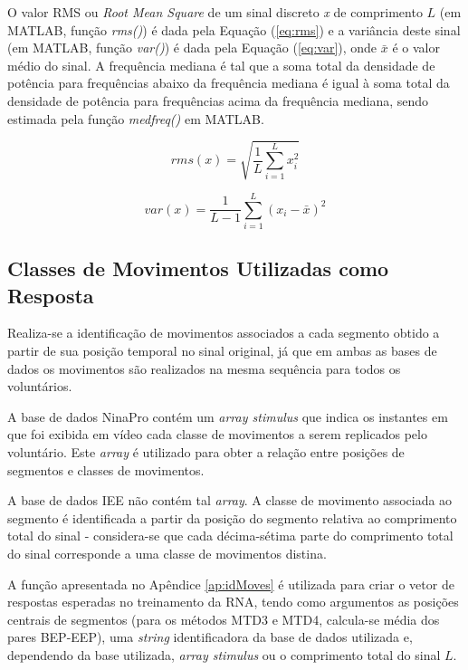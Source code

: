 O valor RMS ou \emph{Root Mean Square} de um sinal discreto \emph{x} de comprimento $L$ (em MATLAB, função \emph{rms()}) é dada pela Equação (\ref{eq:rms}) e a variância deste sinal (em MATLAB, função \emph{var()}) é dada pela Equação (\ref{eq:var}), onde $\bar{x}$ é o valor médio do sinal. A frequência mediana é tal que a soma total da densidade de potência para frequências abaixo da frequência mediana é igual à soma total da densidade de potência para frequências acima da frequência mediana, sendo estimada pela função \emph{medfreq()} em MATLAB.

\begin{equation}
	\label{eq:rms}
	rms(x) = \sqrt{\frac{1}{L}\sum\limits_{i=1}^{L}x_i^2} 
\end{equation}

\begin{equation}
	\label{eq:var}
	var(x) = \frac{1}{L-1}\sum\limits_{i=1}^{L}(x_i - \bar{x})^2
\end{equation}

			\subsection{Classes de Movimentos Utilizadas como Resposta}
Realiza-se a identificação de movimentos associados a cada segmento obtido a partir de sua posição temporal no sinal original, já que em ambas as bases de dados os movimentos são realizados na mesma sequência para todos os voluntários.

A base de dados NinaPro contém um \emph{array stimulus} que indica os instantes em que foi exibida em vídeo cada classe de movimentos a serem replicados pelo voluntário. Este \emph{array} é utilizado para obter a relação entre posições de segmentos e classes de movimentos.

A base de dados IEE não contém tal \emph{array}. A classe de movimento associada ao segmento é identificada a partir da posição do segmento relativa ao comprimento total do sinal - considera-se que cada décima-sétima parte do comprimento total do sinal corresponde a uma classe de movimentos distina.

A função apresentada no Apêndice \ref{ap:idMoves} é utilizada para criar o vetor de respostas esperadas no treinamento da RNA, tendo como argumentos as posições centrais de segmentos (para os métodos MTD3 e MTD4, calcula-se média dos pares BEP-EEP), uma \emph{string} identificadora da base de dados utilizada e, dependendo da base utilizada, \emph{array stimulus} ou o comprimento total do sinal $L$.

